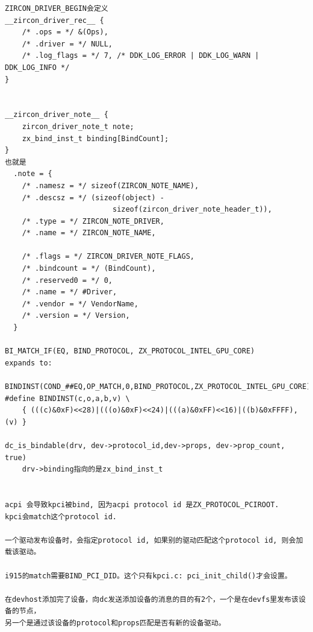 \begin{verbatim}
ZIRCON_DRIVER_BEGIN会定义
__zircon_driver_rec__ {
    /* .ops = */ &(Ops),
    /* .driver = */ NULL,
    /* .log_flags = */ 7, /* DDK_LOG_ERROR | DDK_LOG_WARN | DDK_LOG_INFO */
}


__zircon_driver_note__ {
    zircon_driver_note_t note;
    zx_bind_inst_t binding[BindCount];
}
也就是
  .note = {
    /* .namesz = */ sizeof(ZIRCON_NOTE_NAME),              
    /* .descsz = */ (sizeof(object) -                       
                         sizeof(zircon_driver_note_header_t)), 
    /* .type = */ ZIRCON_NOTE_DRIVER,                      
    /* .name = */ ZIRCON_NOTE_NAME,  
    
    /* .flags = */ ZIRCON_DRIVER_NOTE_FLAGS,                    
    /* .bindcount = */ (BindCount),                             
    /* .reserved0 = */ 0,                                       
    /* .name = */ #Driver,                                      
    /* .vendor = */ VendorName,                                 
    /* .version = */ Version,            
  }

BI_MATCH_IF(EQ, BIND_PROTOCOL, ZX_PROTOCOL_INTEL_GPU_CORE)
expands to:

BINDINST(COND_##EQ,OP_MATCH,0,BIND_PROTOCOL,ZX_PROTOCOL_INTEL_GPU_CORE)
#define BINDINST(c,o,a,b,v) \
    { (((c)&0xF)<<28)|(((o)&0xF)<<24)|(((a)&0xFF)<<16)|((b)&0xFFFF),(v) }

dc_is_bindable(drv, dev->protocol_id,dev->props, dev->prop_count, true)
    drv->binding指向的是zx_bind_inst_t


acpi 会导致kpci被bind, 因为acpi protocol id 是ZX_PROTOCOL_PCIROOT.
kpci会match这个protocol id.

一个驱动发布设备时，会指定protocol id, 如果别的驱动匹配这个protocol id, 则会加载该驱动。

i915的match需要BIND_PCI_DID。这个只有kpci.c: pci_init_child()才会设置。

在devhost添加完了设备，向dc发送添加设备的消息的目的有2个，一个是在devfs里发布该设备的节点，
另一个是通过该设备的protocol和props匹配是否有新的设备驱动。
\end{verbatim}


